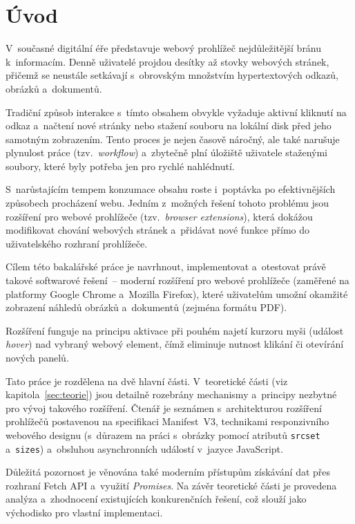 \documentclass[a4paper,12pt]{article}
\begin{document}
\section*{Úvod}
\label{sec:uvod}
 
V~současné digitální éře představuje webový prohlížeč nejdůležitější bránu k~informacím. Denně uživatelé projdou desítky až stovky webových stránek, přičemž se neustále setkávají s~obrovským množstvím hypertextových odkazů, obrázků a~dokumentů. 

Tradiční způsob interakce s~tímto obsahem obvykle vyžaduje aktivní kliknutí na odkaz a~načtení nové stránky nebo stažení souboru na lokální disk před jeho samotným zobrazením. Tento proces je nejen časově náročný, ale také narušuje plynulost práce (tzv.~\textit{workflow}) a~zbytečně plní úložiště uživatele staženými soubory, které byly potřeba jen pro rychlé nahlédnutí.

S~narůstajícím tempem konzumace obsahu roste i~poptávka po efektivnějších způsobech procházení webu. Jedním z~možných řešení tohoto problému jsou rozšíření pro webové prohlížeče (tzv.~\textit{browser extensions}), která dokážou modifikovat chování webových stránek a~přidávat nové funkce přímo do uživatelského rozhraní prohlížeče.

Cílem této bakalářské práce je navrhnout, implementovat a~otestovat právě takové softwarové řešení~-- moderní rozšíření pro webové prohlížeče (zaměřené na platformy Google Chrome a~Mozilla Firefox), které uživatelům umožní okamžité zobrazení náhledů obrázků a~dokumentů (zejména formátu PDF). 

Rozšíření funguje na principu aktivace při pouhém najetí kurzoru myši (událost \textit{hover}) nad vybraný webový element, čímž eliminuje nutnost klikání či otevírání nových panelů. 

Tato práce je rozdělena na dvě hlavní části. V~teoretické části (viz kapitola~\ref{sec:teorie}) jsou detailně rozebrány mechanismy a~principy nezbytné pro vývoj takového rozšíření. Čtenář je seznámen s~architekturou rozšíření prohlížečů postavenou na specifikaci Manifest~V3, technikami responzivního webového designu (s~důrazem na práci s~obrázky pomocí atributů \texttt{srcset} a~\texttt{sizes}) a~obsluhou asynchronních událostí v~jazyce JavaScript. 

Důležitá pozornost je věnována také moderním přístupům získávání dat přes rozhraní Fetch API a~využití \textit{Promises}. Na závěr teoretické části je provedena analýza a~zhodnocení existujících konkurenčních řešení, což slouží jako východisko pro vlastní implementaci.
\end{document}
